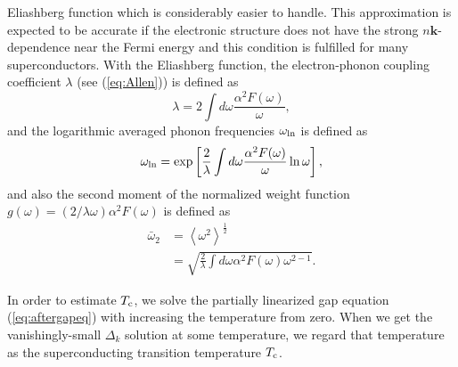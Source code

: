 Eliashberg function which is considerably easier to handle.
This approximation is expected to be accurate if the electronic structure does not have the
strong $n\bm k$-dependence near the Fermi energy and this condition is fulfilled for 
many superconductors.
With the Eliashberg function, the electron-phonon coupling coefficient $\lambda$ 
(see (\ref{eq:Allen})) is defined as
%
\begin{equation}
	\lambda = 2\int d\omega \frac{\alpha^2F(\omega)}{\omega},
	\label{eq:elphlambda}
\end{equation}
%
and the logarithmic averaged phonon frequencies $\omega_{\rm ln}$ is defined as
%
\begin{equation}
	\omega_{\rm ln} = \exp\left[ \frac{2}{\lambda}\int d\omega \frac{\alpha^2F(\omega)}{\omega}\ln \omega \right],
	\label{eq:omegaln}
\end{equation}
%
and also the second moment of the normalized weight function 
$g(\omega) = (2/\lambda\omega)\alpha^{2}F(\omega)$\cite{AllenDynes} is defined as
%
\begin{equation}
\begin{split}
	\bar{\omega}_2 &= \left<\omega^2 \right>^{\frac{1}{2}} \\
	&=
	\sqrt{\frac{2}{\lambda}\int d\omega \alpha^2F(\omega)\omega^{2-1}}.
	\label{eq:secondmoment}
\end{split}
\end{equation}

In order to estimate $T_{\rm c}$, we solve the partially linearized gap equation (\ref{eq:aftergapeq}) with increasing 
the temperature from zero. When we get the vanishingly-small $\Delta_{k}$ solution at some temperature, 
we regard that temperature as the superconducting transition temperature $T_{\rm c}$.
%
%

